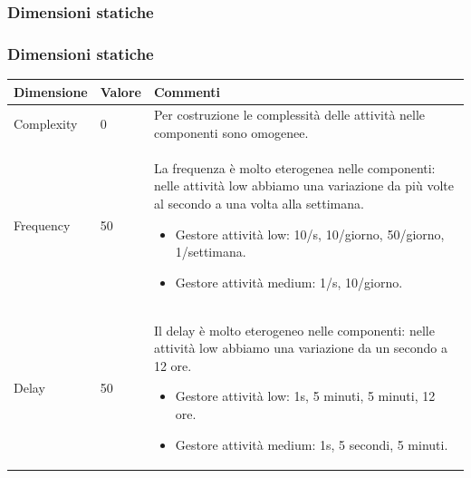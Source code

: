 \documentclass{beamer}
\begin{document}
	\subsubsection{Dimensioni statiche}
		\begin{frame}[allowframebreaks]
		\frametitle{Dimensioni statiche}			
		\begin{center}
			\begin{table}
				\tiny
				\centering
				{\renewcommand{\arraystretch}{1.2}
					
					\begin{tabular}{|M{0.1\textwidth}|M{0.1\textwidth}|p{.6\textwidth}|}
						\hline
						Dimensione & Valore & Commenti \\
						\hline
						Complexity & 0 & Per costruzione le complessità delle attività nelle componenti sono omogenee. \\
						Frequency & 50 & La frequenza è molto eterogenea nelle componenti: nelle attività low abbiamo una variazione da più volte al secondo a una volta alla settimana.
						\begin{itemize}
							\item Gestore attività low: 10/s, 10/giorno, 50/giorno, 1/settimana.
							\item Gestore attività medium: 1/s, 10/giorno.
						\end{itemize} \\
						Delay & 50 & Il delay è molto eterogeneo nelle componenti: nelle attività low abbiamo una variazione da un secondo a 12 ore.
						\begin{itemize}
							\item Gestore attività low: 1s, 5 minuti, 5 minuti, 12 ore.
							\item Gestore attività medium: 1s, 5 secondi, 5 minuti.
						\end{itemize} \\
						\hline
				\end{tabular}}
			\end{table}
		\end{center}
		
		\pagebreak
		
		\begin{center}
			\begin{table}
				\tiny
				\centering
				{\renewcommand{\arraystretch}{1.2}
					
}
\end{table}
\end{center}
\end{frame}
\end{document}
